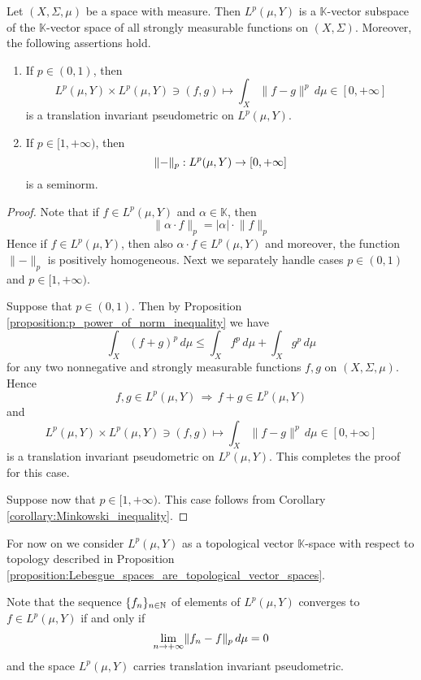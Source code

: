 \documentclass[10pt]{amsart}
\begin{document}
\begin{proposition}\label{proposition:Lebesgue_spaces_are_topological_vector_spaces}
	Let $(X,\Sigma,\mu)$ be a space with measure. Then $L^p(\mu,Y)$ is a $\mathbb{K}$-vector subspace of the $\mathbb{K}$-vector space of all strongly measurable functions on $(X,\Sigma)$. Moreover, the following assertions hold.
	\begin{enumerate}[label=\emph{\textbf{(\arabic*)}}, leftmargin=*]
		\item If $p \in (0,1)$, then
			$$L^p(\mu,Y)\times L^p(\mu,Y) \ni (f,g) \mapsto \int_X\lVert f - g\rVert^p\,d\mu \in [0,+\infty]$$
		      is a translation invariant pseudometric on $L^p(\mu,Y)$.
		\item If $p \in [1,+\infty)$, then
			$$\lVert-\rVert_p:L^p(\mu,Y)\rightarrow [0,+\infty]$$
		      is a seminorm.
	\end{enumerate}
\end{proposition}
\begin{proof}
	Note that if $f\in L^p(\mu,Y)$ and $\alpha \in \mathbb{K}$, then
	$$\lVert \alpha \cdot f\rVert_p = |\alpha|\cdot \lVert f\rVert_p$$
	Hence if $f\in L^p(\mu,Y)$, then also $\alpha \cdot f \in L^p(\mu,Y)$ and moreover, the function $\lVert -\rVert_p$ is positively homogeneous. Next we separately handle cases $p \in (0,1)$ and $p \in [1,+\infty)$.

	Suppose that $p \in (0,1)$. Then by Proposition \ref{proposition:p_power_of_norm_inequality} we have
	$$\int_X\left(f + g\right)^p\,d\mu \leq \int_X f^p\,d\mu + \int_X g^p\,d\mu$$
	for any two nonnegative and strongly measurable functions $f,g$ on $(X,\Sigma,\mu)$. Hence
	$$f,g\in L^p(\mu,Y)\,\Rightarrow\,f+g\in L^p(\mu,Y)$$
	and
	$$L^p(\mu,Y)\times L^p(\mu,Y) \ni (f,g) \mapsto \int_X\lVert f - g\rVert^p\,d\mu \in [0,+\infty]$$
	is a translation invariant pseudometric on $L^p(\mu,Y)$. This completes the proof for this case.

	Suppose now that $p\in [1,+\infty)$. This case follows from Corollary \ref{corollary:Minkowski_inequality}.
\end{proof}
\noindent
For now on we consider $L^p(\mu,Y)$ as a topological vector $\mathbb{K}$-space with respect to topology described in Proposition \ref{proposition:Lebesgue_spaces_are_topological_vector_spaces}.

\begin{remark}\label{remark:topology_of_Lebesgue_spaces_is_sequential}
	Note that the sequence $\{f_n\}_{n\in {\mathbb N}}$ of elements of $L^p(\mu,Y)$ converges to $f\in L^p(\mu,Y)$ if and only if
	$$\lim_{n\rightarrow +\infty}\lVert f_n - f\rVert_p\,d\mu = 0$$
	and the space $L^p(\mu,Y)$ carries translation invariant pseudometric.
\end{remark}
\end{document}
